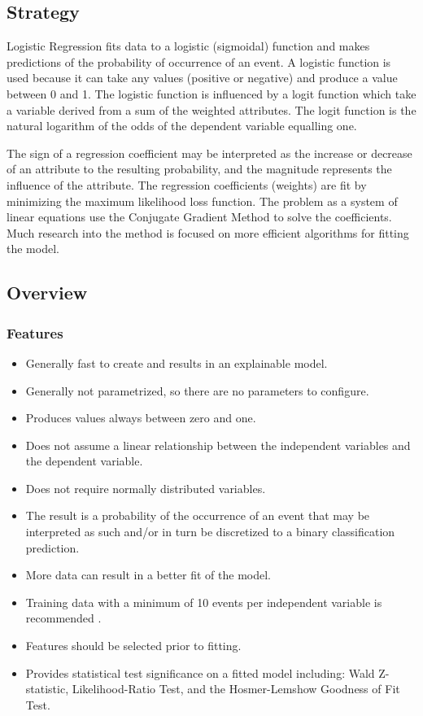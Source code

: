 \subsection{Strategy}
Logistic Regression fits data to a logistic (sigmoidal) function and makes predictions of the probability of occurrence of an event. 
A logistic function is used because it can take any values (positive or negative) and produce a value between 0 and 1. The logistic function is influenced by a logit function which take a variable derived from a sum of the weighted attributes. The logit function is the natural logarithm of the odds of the dependent variable equalling one.

The sign of a regression coefficient may be interpreted as the increase or decrease of an attribute to the resulting probability, and the magnitude represents the influence of the attribute.
The regression coefficients (weights) are fit by minimizing the maximum likelihood loss function. The problem as a system of linear equations use the Conjugate Gradient Method to solve the coefficients. Much research into the method is focused on more efficient algorithms for fitting the model.


\subsection{Overview}

\subsubsection{Features}

\begin{itemize}
	\item Generally fast to create and results in an explainable model.
	\item Generally not parametrized, so there are no parameters to configure.
	\item Produces values always between zero and one. 
	\item Does not assume a linear relationship between the independent variables and the dependent variable. 
	\item Does not require normally distributed variables.
	\item The result is a probability of the occurrence of an event that may be interpreted as such and/or in turn be discretized to a binary classification prediction.
	\item More data can result in a better fit of the model.
	\item Training data with a minimum of 10 events per independent variable is recommended \cite{Peduzzi1996}.
	\item Features should be selected prior to fitting.
	\item Provides statistical test significance on a fitted model including: Wald Z-statistic, Likelihood-Ratio Test, and the Hosmer-Lemshow Goodness of Fit Test.
\end{itemize}

